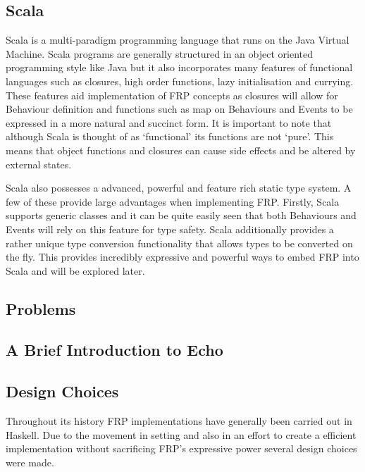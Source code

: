 \documentclass[12pt]{article}
\begin{document}
    \subsection{Scala}
      Scala is a multi-paradigm programming language that runs on the Java Virtual Machine. Scala programs are
      generally structured in an object oriented programming style like Java but it also incorporates many features of
      functional languages such as closures, high order functions, lazy initialisation and currying. These features aid
      implementation of FRP concepts as closures will allow for Behaviour definition and functions such as map on
      Behaviours and Events to be expressed in a more natural and succinct form. It is
      important to note that although Scala is thought of as `functional' its functions are not `pure'. This means
      that object functions and closures can cause side effects and be altered by external states.
      
      Scala also possesses a advanced, powerful and feature rich static type system. A few of these provide large
      advantages when implementing FRP. Firstly, Scala supports generic classes and it can be quite easily seen
      that both Behaviours and Events will rely on this feature for type safety. Scala additionally provides
      a rather unique type conversion functionality that allows types to be converted on the fly. This provides
      incredibly expressive and powerful ways to embed FRP into Scala and will be explored later.
      
    \subsection{Problems}
      
    \subsection{A Brief Introduction to Echo}
    
    \subsection{Design Choices}
    Throughout its history FRP implementations have generally been carried out in Haskell. Due to the movement
    in setting and also in an effort to create a efficient implementation without sacrificing FRP's expressive power
    several design choices were made. 
    
\end{document}
